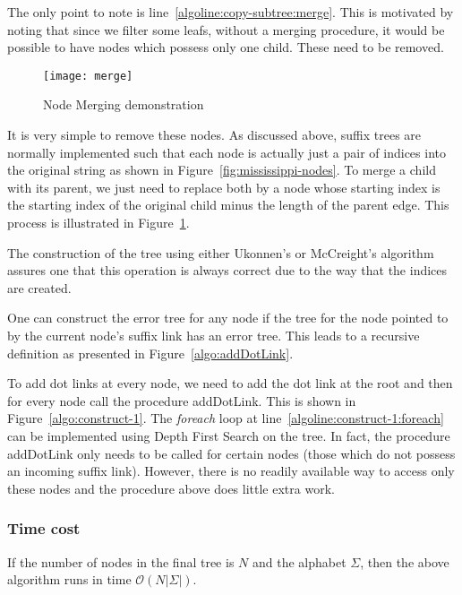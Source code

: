The only point to note is line~\ref{algoline:copy-subtree:merge}. This is motivated by noting that since we filter some leafs, without a merging procedure, it would be possible to have nodes which possess only one child. These need to be removed.

\begin{figure}
\centering
\texttt{[image: merge]}
\caption{Node Merging demonstration}%
\label{fig:merge}
\end{figure}

It is very simple to remove these nodes. As discussed above, suffix trees are normally implemented such that each node is actually just a pair of indices into the original string as shown in Figure~\ref{fig:mississippi-nodes}. To merge a child with its parent, we just need to replace both by a node whose starting index is the starting index of the original child minus the length of the parent edge. This process is illustrated in Figure~\ref{fig:merge}.

The construction of the tree using either Ukonnen's or McCreight's algorithm assures one that this operation is always correct due to the way that the indices are created.



One can construct the error tree for any node if the tree for the node pointed to by the current node's suffix link has an error tree. This leads to a recursive definition as presented in Figure~\ref{algo:addDotLink}. 



To add dot links at every node, we need to add the dot link at the root and then for every node call the procedure addDotLink. This is shown in Figure~\ref{algo:construct-1}. The \textit{foreach} loop at line~\ref{algoline:construct-1:foreach} can be implemented using Depth First Search on the tree. In fact, the procedure addDotLink only needs to be called for certain nodes (those which do not possess an incoming suffix link). However, there is no readily available way to access only these nodes and the procedure above does little extra work.

\subsubsection{Time cost}

If the number of nodes in the final tree is $N$ and the alphabet $\Sigma$, then the above algorithm runs in time $\mathcal{O}(N|\Sigma|)$.

